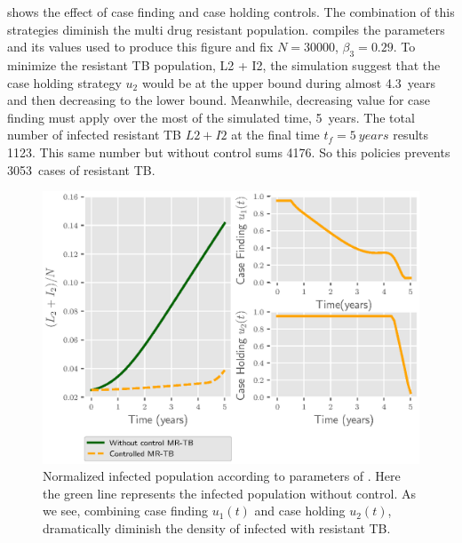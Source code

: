 %
	 shows the effect of case finding and 
case holding controls. The combination of this strategies diminish the multi 
drug resistant population.  compiles the 
parameters and its values used to produce this figure and fix 
$N = \num{30000}$, $\beta_3 = \num{0.29}$. To minimize the resistant TB 
population, L2 + I2, the simulation suggest that the case holding strategy 
$u_2$ would be at the upper bound during almost \SI{4.3}{years} and then 
decreasing to the lower bound. Meanwhile, decreasing value for case finding
must apply over the most of the simulated time, \SI{5}{years}. The total number 
of 
infected resistant TB $L2 + I2$  at the final time $t_f = \SI{5}{years}$ results
\num{1123}. This same number but without control sums 4176. So this policies 
prevents \SI{3053}{cases} of resistant TB.


\begin{figure}
  \centering
  \includegraphics{Figures/figure_1_two_strain_tbm}
  \caption{Normalized infected population according to parameters of 
  . Here the green line represents the 
  infected population without control. As we see, combining case finding 
  $u_1(t)$ and  case holding $u_2(t)$, dramatically diminish the density of 
  infected with resistant TB.}
  \label{fig:figure1twostraintbm}
\end{figure}

